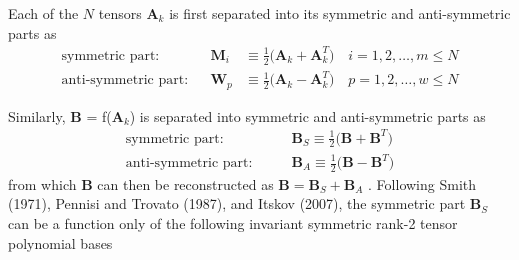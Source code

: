 Each of the $N$ tensors $\mathbf{A}_{k}$ is first separated into its symmetric and anti-symmetric parts as
%
\begin{subequations}
\label{E:26}
\begin{align}
 	\text{symmetric part:} &&
	\mathbf{M}_{i} &\equiv \frac{1}{2} \big( \mathbf{A}_k + \mathbf{A}^T_k \big) \quad
	i = 1,2, \ldots, m \leq N \\
	\text{anti-symmetric part:} && 
	\mathbf{W}_{p} &\equiv \frac{1}{2} \big( \mathbf{A}_k - \mathbf{A}^T_k \big) \quad
	p = 1,2, \ldots, w \leq N 
\end{align}
\end{subequations}
%
%    

Similarly, $\mathbf{B}$ = f($\mathbf{A}_{k}$)  is separated into symmetric and anti-symmetric parts as
%
\begin{subequations}
\label{E:27}
\begin{align}
 	\text{symmetric part:} & \qquad
	\mathbf{B}_{S} \equiv \frac{1}{2} \big( \mathbf{B} + \mathbf{B}^T \big) \\
	\text{anti-symmetric part:} & \qquad
	\mathbf{B}_{A} \equiv \frac{1}{2} \big( \mathbf{B} - \mathbf{B}^T \big) 
\end{align}
\end{subequations}
%
%    
from which $\mathbf{B}$ can then be reconstructed as $ \mathbf{B}= \mathbf{B}_S + \mathbf{B}_A$ . Following Smith (1971), Pennisi and Trovato (1987), and Itskov (2007), the symmetric part  $\mathbf{B}_S$ can be a function only of the following invariant symmetric rank-2 tensor polynomial bases
%
